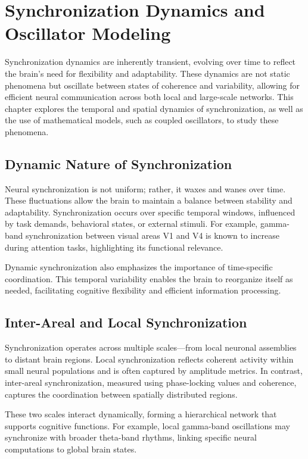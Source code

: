 \section{Synchronization Dynamics and Oscillator Modeling}

Synchronization dynamics are inherently transient, evolving over time to reflect the brain’s need for flexibility and adaptability. These dynamics are not static phenomena but oscillate between states of coherence and variability, allowing for efficient neural communication across both local and large-scale networks. This chapter explores the temporal and spatial dynamics of synchronization, as well as the use of mathematical models, such as coupled oscillators, to study these phenomena.

\subsection*{Dynamic Nature of Synchronization}

Neural synchronization is not uniform; rather, it waxes and wanes over time. These fluctuations allow the brain to maintain a balance between stability and adaptability. Synchronization occurs over specific temporal windows, influenced by task demands, behavioral states, or external stimuli. For example, gamma-band synchronization between visual areas V1 and V4 is known to increase during attention tasks, highlighting its functional relevance.

Dynamic synchronization also emphasizes the importance of time-specific coordination. This temporal variability enables the brain to reorganize itself as needed, facilitating cognitive flexibility and efficient information processing.

\subsection*{Inter-Areal and Local Synchronization}

Synchronization operates across multiple scales—from local neuronal assemblies to distant brain regions. Local synchronization reflects coherent activity within small neural populations and is often captured by amplitude metrics. In contrast, inter-areal synchronization, measured using phase-locking values and coherence, captures the coordination between spatially distributed regions.

These two scales interact dynamically, forming a hierarchical network that supports cognitive functions. For example, local gamma-band oscillations may synchronize with broader theta-band rhythms, linking specific neural computations to global brain states.

